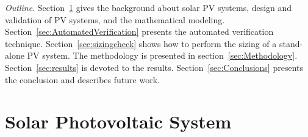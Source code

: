 \documentclass[review]{elsarticle}
\begin{document}
%
 
\textit{Outline}. Section~\ref{sec:SolarPhotovoltaicSystem} gives the background about solar PV systems, design and validation of PV systems, and the mathematical modeling. Section~\ref{sec:AutomatedVerification} presents the automated verification technique. Section~\ref{sec:sizingcheck} shows how to perform the sizing of a stand-alone PV system. The methodology is presented in section~\ref{sec:Methodology}. Section~\ref{sec:results} is devoted to the results. Section~\ref{sec:Conclusions} presents the conclusion and describes future work.

\section{Solar Photovoltaic System }
\label{sec:SolarPhotovoltaicSystem}

\end{document}

